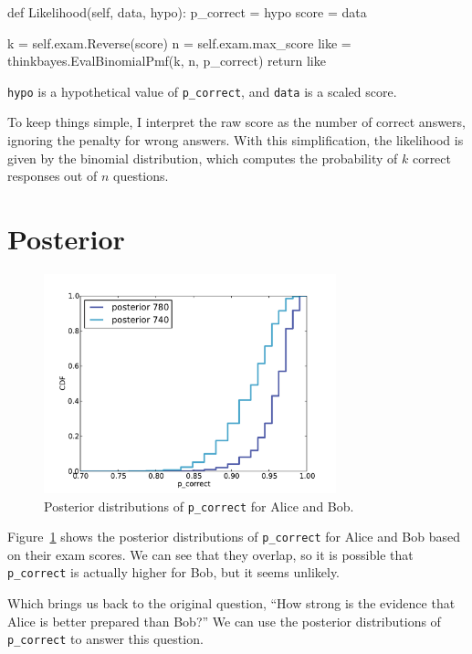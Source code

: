 \documentclass[12pt]{book}
\theoremstyle{exercise}
\begin{document}
\begin{code}
    def Likelihood(self, data, hypo):
        p_correct = hypo
        score = data

        k = self.exam.Reverse(score)
        n = self.exam.max_score
        like = thinkbayes.EvalBinomialPmf(k, n, p_correct)
        return like
\end{code}

{\tt hypo} is a hypothetical
value of \verb"p_correct", and {\tt data} is a scaled score.

To keep things simple, I interpret the raw score as the number of
correct answers, ignoring the penalty for wrong answers.  With
this simplification, the likelihood is given by the binomial
distribution, which computes the probability of $k$ correct
responses out of $n$ questions.


\section{Posterior}

\begin{figure}
\centerline{\includegraphics[height=2.5in]{figs/sat_posteriors_p_corr.pdf}}
\caption{Posterior distributions of {\tt p\_correct} for Alice and Bob.}
\label{fig.satposterior1}
\end{figure}

Figure~\ref{fig.satposterior1} shows the posterior distributions
of \verb"p_correct" for Alice and Bob based on their exam scores.
We can see that they overlap, so it is possible that \verb"p_correct"
is actually higher for Bob, but it seems unlikely.

Which brings us back to the original question, ``How strong is the
evidence that Alice is better prepared than Bob?''  We can use the
posterior distributions of \verb"p_correct" to answer this question.
\end{document}

